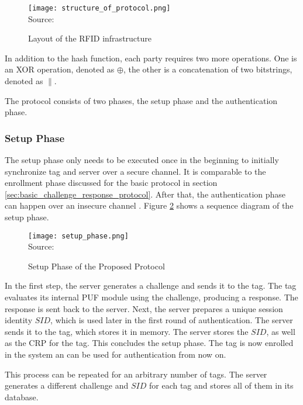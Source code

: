 \begin{figure}[H]
    \centering
    \caption{Layout of the RFID infrastructure}
    \label{fig:protocol_structure}
    \texttt{[image: structure\_of\_protocol.png]}
    \\
    Source: \cite[][p. 5]{Zhu2019}
\end{figure}

In addition to the hash function, each party requires two more operations.
One is an XOR operation, denoted as $\oplus$, the other is a concatenation of two bitstrings, denoted as $\parallel$.

The protocol consists of two phases, the setup phase and the authentication phase. \cite[][p. 6-8]{Zhu2019}

\subsubsection{Setup Phase}

The setup phase only needs to be executed once in the beginning to initially synchronize tag and server over a
secure channel. It is comparable to the enrollment phase discussed for the basic protocol in section \ref{sec:basic_challenge_response_protocol}.
After that, the authentication phase can happen over an insecure channel \cite[][p. 7]{Zhu2019}.
Figure \ref{fig:protocol_setup} shows a sequence diagram of the setup phase.

\begin{figure}[H]
    \centering
    \caption{Setup Phase of the Proposed Protocol}
    \label{fig:protocol_setup}
    \texttt{[image: setup\_phase.png]}
    \\
    Source: \cite[][p. 6]{Zhu2019}
\end{figure}

In the first step, the server generates a challenge and sends it to the tag.
The tag evaluates its internal PUF module using the challenge, producing a response.
The response is sent back to the server.
Next, the server prepares a unique session identity $SID$, which is used later in the first round of
authentication. The server sends it to the tag, which stores it in memory.
The server stores the $SID$, as well as the \ac{CRP} for the tag.
This concludes the setup phase. The tag is now enrolled in the system an can be used for authentication
from now on. \cite[][p. 7]{Zhu2019}

This process can be repeated for an arbitrary number of tags. The server generates a different challenge
and $SID$ for each tag and stores all of them in its database. \cite[][p. 7]{Zhu2019}

